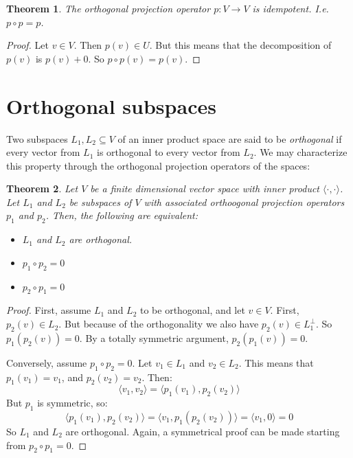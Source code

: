 \documentclass[12pt, a4paper]{article}
\newtheorem{theorem}{Theorem}[section]
\numberwithin{equation}{section}
\begin{document}
\begin{theorem}
The orthogonal projection operator $p:V\rightarrow V$ is idempotent. I.e. $p\circ p=p$.
\end{theorem}
\begin{proof}
Let $v\in V$. Then $p(v)\in U$. But this means that the decomposition of $p(v)$ is $p(v)+0$. So $p\circ p(v)=p(v)$.
\end{proof}

\section{Orthogonal subspaces}
Two subspaces $L_1, L_2\subseteq V$ of an inner product space are said to be \textit{orthogonal} if every vector from $L_1$ is orthogonal to every vector from $L_2$. We may characterize this property through the orthogonal projection operators of the spaces:
\begin{theorem}
\label{projection_lemma1}
Let $V$ be a finite dimensional vector space with inner product $\langle\cdot,\cdot\rangle$. Let $L_1$ and $L_2$ be subspaces of $V$ with associated orthoogonal projection operators $p_1$ and $p_2$. Then, the following are equivalent:
\begin{itemize}
\item $L_1$ and $L_2$ are orthogonal.
\item $p_1\circ p_2=0$
\item $p_2\circ p_1=0$
\end{itemize}
\end{theorem}
\begin{proof}
First, assume $L_1$ and $L_2$ to be orthogonal, and let $v\in V$. First, $p_2(v)\in L_2$. But because of the orthogonality we also have $p_2(v)\in L_1^\perp$. So $p_1(p_2(v))=0$. By a totally symmetric argument, $p_2(p_1(v))=0$.

Conversely, assume $p_1\circ p_2=0$. Let $v_1\in L_1$ and $v_2\in L_2$. This means that $p_1(v_1)=v_1$, and $p_2(v_2)=v_2$. Then:
\begin{equation}
\langle v_1,v_2\rangle=\langle p_1(v_1),p_2(v_2)\rangle
\end{equation}
But $p_1$ is symmetric, so:
\begin{equation}
\langle p_1(v_1),p_2(v_2)\rangle=\langle v_1,p_1(p_2(v_2))\rangle=\langle v_1,0\rangle=0
\end{equation}
So $L_1$ and $L_2$ are orthogonal. Again, a symmetrical proof can be made starting from $p_2\circ p_1=0$.
\end{proof}
\end{document}
